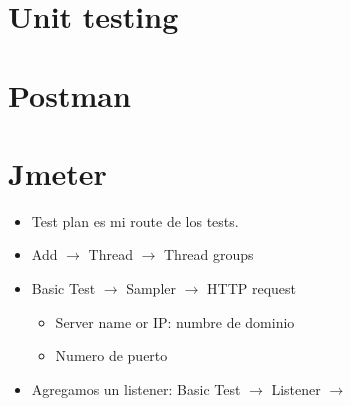 \section{Unit testing}

\section{Postman}

\section{Jmeter}
\begin{itemize}[label=$\downarrow$]
    \item Test plan es mi route de los tests.
    \item Add $\rightarrow$ Thread $\rightarrow$ Thread groups
    \item Basic Test $\rightarrow$ Sampler $\rightarrow$ HTTP request
        \begin{itemize}[label=$\downarrow$]
            \item Server name or IP: numbre de dominio 
            \item Numero de puerto 
        \end{itemize}
    \item Agregamos un listener:
        Basic Test $\rightarrow$ Listener $\rightarrow$ 
        
\end{itemize}
